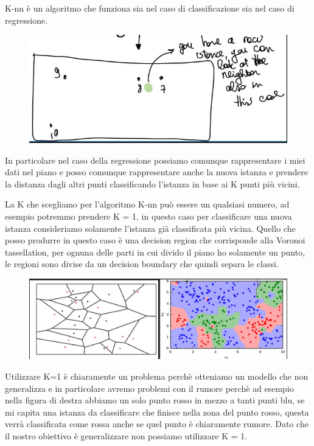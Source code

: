 \documentclass[14pt]{extreport}
\begin{document}
K-nn è un algoritmo che funziona sia nel caso di classificazione sia nel caso di regressione.

\begin{figure}[H]
	\centering
	\includegraphics[width=0.7\linewidth]{57.jpeg}
\end{figure}

In particolare nel caso della regressione possiamo comunque rappresentare i miei dati nel piano e posso comunque rappresentare anche la nuova istanza
e prendere la distanza dagli altri punti classificando l’istanza in base ai K punti più vicini.

La K che scegliamo per l’algoritmo K-nn può essere un qualsiasi numero, ad esempio potremmo prendere K = 1, in questo caso per classificare una nuova
istanza consideriamo solamente l’istanza già classificata più vicina. Quello che posso produrre in questo caso è una decision region che corrisponde
alla Voronoi tassellation, per ognuna delle parti in cui divido il piano ho solamente un punto, le regioni sono divise da un decision boundary che
quindi separa le classi.

\begin{figure}[H]
	\centering
	\includegraphics[width=0.7\linewidth]{58.jpeg}
\end{figure}

Utilizzare K=1 è chiaramente un problema perchè otteniamo un modello che non generalizza e in particolare avremo problemi con il rumore perchè ad
esempio nella figura di destra abbiamo un solo punto rosso in mezzo a tanti punti blu, se mi capita una istanza da classificare che finisce nella zona
del punto rosso, questa verrà classificata come rossa anche se quel punto è chiaramente rumore. Dato che il nostro obiettivo è generalizzare non
possiamo utilizzare K = 1.
\end{document}
